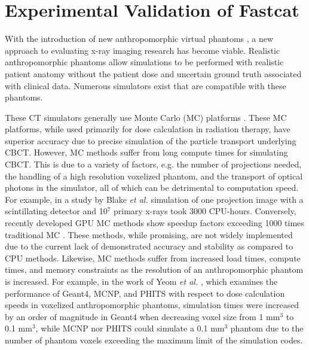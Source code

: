 \section{Experimental Validation of Fastcat}

With the introduction of new anthropomorphic virtual phantoms \cite{Xu2011DynamicStudy,Kainz2018AdvancesReview}, a new approach to evaluating x-ray imaging research has become viable. Realistic anthropomorphic phantoms allow simulations to be performed with realistic patient anatomy without the patient dose and uncertain ground truth associated with clinical data. Numerous simulators exist that are compatible with these phantoms.

These CT simulators generally use Monte Carlo (MC) platforms \cite{Badal2009AcceleratingUnit,Li2011Patient-specificPatients,Jiang2004AdaptationData}. These MC platforms, while used primarily for dose calculation in radiation therapy, have superior accuracy due to precise simulation of the particle transport underlying CBCT. However, MC methods suffer from long compute times for simulating CBCT. This is due to a variety of factors, e.g. the number of projections needed, the handling of a high resolution voxelized phantom, and the transport of optical photons in the simulator, all of which can be detrimental to computation speed. For example, in a study by Blake \textit{et al.} \cite{Blake2013CharacterizationGeant4} simulation of one projection image with a scintillating detector and 10$^7$ primary x-rays took 3000 CPU-hours. Conversely, recently developed GPU MC methods show speedup factors exceeding 1000 times traditional MC \cite{Simon2017OpticksOptiX}. These methods, while promising, are not widely implemented due to the current lack of demonstrated accuracy and stability as compared to CPU methods. Likewise, MC methods suffer from increased load times, compute times, and memory constraints as the resolution of an anthropomorphic phantom is increased. For example, in the work of Yeom \textit{et al.} \cite{Yeom2019ComputationPHITS}, which examines the performance of Geant4, MCNP, and PHITS with respect to dose calculation speeds in voxelized anthropomorphic phantoms, simulation times were increased by an order of magnitude in Geant4 when decreasing voxel size from 1 mm$^3$ to 0.1 mm$^3$, while MCNP nor PHITS could simulate a 0.1 mm$^3$ phantom due to the number of phantom voxels exceeding the maximum limit of the simulation codes.

